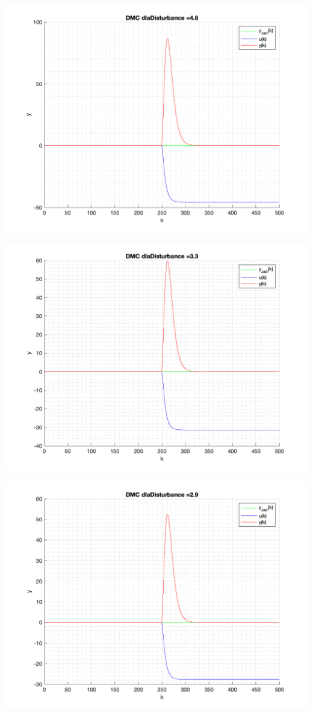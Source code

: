 \documentclass[a4paper, 11pt]{article}
\begin{document}
\begin{enumerate}
 \includegraphics[width=\linewidth]{./ModelsP4_Disturbance/P4_DMC_Disturbance_4_8_png.png} 
 
 \includegraphics[width=\linewidth]{./ModelsP4_Disturbance/P4_DMC_Disturbance_3_3_png.png} 
 
 \includegraphics[width=\linewidth]{./ModelsP4_Disturbance/P4_DMC_Disturbance_2_9_png.png} 
 

\end{enumerate}
\end{document}
